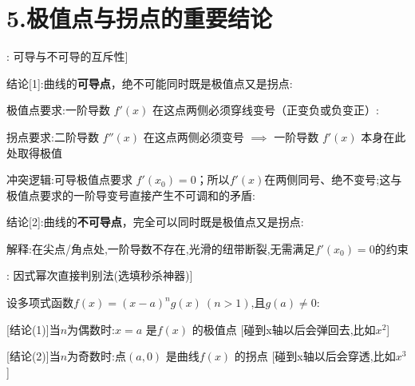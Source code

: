 \documentclass[11pt,a4paper,UTF8]{ctexart}
\begin{document}
\section{5.极值点与拐点的重要结论}

\begin{thmbox}[结论[1]: 可导与不可导的互斥性]

结论[1]:曲线的\textbf{可导点}，绝不可能同时既是极值点又是拐点:

  极值点要求:一阶导数 $f'(x)$ 在这点两侧必须穿线变号（正变负或负变正）:

  拐点要求:二阶导数 $f''(x)$ 在这点两侧必须变号 $\implies$ 一阶导数 $f'(x)$ 本身在此处取得极值

  冲突逻辑:可导极值点要求 $f'(x_0) = 0$；所以$f'(x)$在两侧同号、绝不变号;这与极值点要求的一阶导变号直接产生不可调和的矛盾:

结论[2]:曲线的\textbf{不可导点}，完全可以同时既是极值点又是拐点:

  解释:在尖点/角点处,一阶导数不存在,光滑的纽带断裂,无需满足$f'(x_0) = 0$的约束

\end{thmbox}
\begin{thmbox}[结论[2]: 因式幂次直接判别法(选填秒杀神器)]

设多项式函数$f(x) = (x - a)^n g(x)\ (n > 1)$,且$g(a) \neq 0$:

[结论(1)]当$n$为偶数时:$x = a$ 是$f(x)$ 的极值点	[碰到x轴以后会弹回去,比如$x^2$]

[结论(2)]当$n$为奇数时:点$(a, 0)$ 是曲线$f(x)$ 的拐点  [碰到x轴以后会穿透,比如$x^3$]

\end{thmbox}
\end{document}
